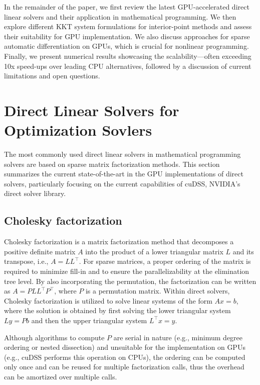 \documentclass{article}
\begin{document}
In the remainder of the paper, we first review the latest GPU-accelerated direct linear solvers and their application in mathematical programming. We then explore different KKT system formulations for interior-point methods and assess their suitability for GPU implementation. We also discuss approaches for sparse automatic differentiation on GPUs, which is crucial for nonlinear programming. Finally, we present numerical results showcasing the scalability—often exceeding 10x speed-ups over leading CPU alternatives, followed by a discussion of current limitations and open questions.


\section{Direct Linear Solvers for Optimization Sovlers}\label{eqn:linear}
The most commonly used direct linear solvers in mathematical programming solvers are based on sparse matrix factorization methods.
This section summarizes the current state-of-the-art in the GPU implementations of direct solvers, particularly focusing on the current capabilities of cuDSS, NVIDIA's direct solver library.



\subsection{Cholesky factorization}
Cholesky factorization is a matrix factorization method that decomposes a positive definite matrix $A$ into the product of a lower triangular matrix $L$ and its transpose, i.e., $A = LL^\top$. For sparse matrices, a proper ordering of the matrix is required to minimize fill-in and to ensure the parallelizability at the elimination tree level. By also incorporating the permutation, the factorization can be written as $A = P L L^\top P^\top$, where $P$ is a permutation matrix.
Within direct solvers, Cholesky factorization is utilized to solve linear systems of the form $Ax = b$, where the solution is obtained by first solving the lower triangular system $Ly = Pb$ and then the upper triangular system $L^\top x = y$.

Although algorithms to compute $P$ are serial in nature (e.g., minimum degree ordering or nested dissection) and unsuitable for the implementation on GPUs (e.g., cuDSS performs this operation on CPUs), the ordering can be computed only once and can be reused for multiple factorization calls, thus the overhead can be amortized over multiple calls.
\end{document}
